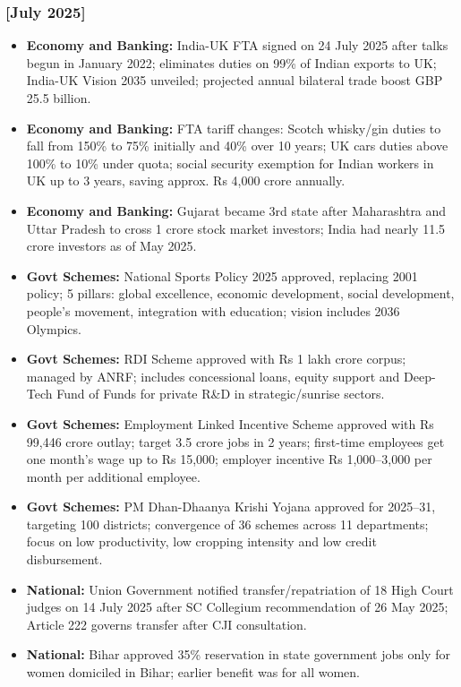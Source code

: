 \documentclass[10pt,a4paper]{article}
\newcommand{\monthtag}[1]{\textbf{[#1]}}
\begin{document}
\subsubsection{\monthtag{July 2025}}
\begin{itemize}
    \item \textbf{Economy and Banking:} India-UK FTA signed on 24 July 2025 after talks begun in January 2022; eliminates duties on 99\% of Indian exports to UK; India-UK Vision 2035 unveiled; projected annual bilateral trade boost GBP 25.5 billion.
    \item \textbf{Economy and Banking:} FTA tariff changes: Scotch whisky/gin duties to fall from 150\% to 75\% initially and 40\% over 10 years; UK cars duties above 100\% to 10\% under quota; social security exemption for Indian workers in UK up to 3 years, saving approx. Rs 4,000 crore annually.
    \item \textbf{Economy and Banking:} Gujarat became 3rd state after Maharashtra and Uttar Pradesh to cross 1 crore stock market investors; India had nearly 11.5 crore investors as of May 2025.
    \item \textbf{Govt Schemes:} National Sports Policy 2025 approved, replacing 2001 policy; 5 pillars: global excellence, economic development, social development, people's movement, integration with education; vision includes 2036 Olympics.
    \item \textbf{Govt Schemes:} RDI Scheme approved with Rs 1 lakh crore corpus; managed by ANRF; includes concessional loans, equity support and Deep-Tech Fund of Funds for private R\&D in strategic/sunrise sectors.
    \item \textbf{Govt Schemes:} Employment Linked Incentive Scheme approved with Rs 99,446 crore outlay; target 3.5 crore jobs in 2 years; first-time employees get one month's wage up to Rs 15,000; employer incentive Rs 1,000--3,000 per month per additional employee.
    \item \textbf{Govt Schemes:} PM Dhan-Dhaanya Krishi Yojana approved for 2025--31, targeting 100 districts; convergence of 36 schemes across 11 departments; focus on low productivity, low cropping intensity and low credit disbursement.
    \item \textbf{National:} Union Government notified transfer/repatriation of 18 High Court judges on 14 July 2025 after SC Collegium recommendation of 26 May 2025; Article 222 governs transfer after CJI consultation.
    \item \textbf{National:} Bihar approved 35\% reservation in state government jobs only for women domiciled in Bihar; earlier benefit was for all women.

\end{itemize}
\end{document}
